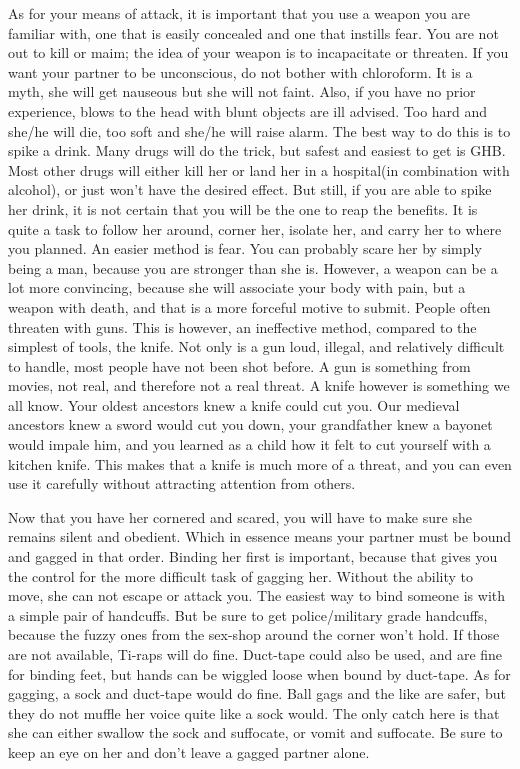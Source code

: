 As for your means of attack, it is important that you use a weapon you are 
familiar with, one that is easily concealed and one that instills fear. You are 
not out to kill or maim; the idea of your weapon is to incapacitate or 
threaten. If you want your partner to be unconscious, do not bother with 
chloroform. It is a myth, she will get nauseous but she will not faint. Also, 
if you have no prior experience, blows to the head with blunt objects are ill 
advised. Too hard and she/he will die, too soft and she/he will raise alarm. 
The best way to do this is to spike a drink. Many drugs will do the trick, but 
safest and easiest to get is GHB. Most other drugs will either kill her or land 
her in a hospital(in combination with alcohol), or just won't have the desired 
effect. But still, if you are able to spike her drink, it is not certain that 
you will be the one to reap the benefits. It is quite a task to follow her 
around, corner her, isolate her, and carry her to where you planned. An easier 
method is fear. You can probably scare her by simply being a man, because you 
are stronger than she is. However, a weapon can be a lot more convincing, 
because she will associate your body with pain, but a weapon with death, and 
that is a more forceful motive to submit. People often threaten with guns. This 
is however, an ineffective method, compared to the simplest of tools, the 
knife. Not only is a gun loud, illegal, and relatively difficult to handle, 
most people have not been shot before. A gun is something from movies, not real, 
and therefore not a real threat. A knife however is something we all know. Your 
oldest ancestors knew a knife could cut you. Our medieval ancestors knew a 
sword would cut you down, your grandfather knew a bayonet would impale him, and 
you learned as a child how it felt to cut yourself with a kitchen knife. This 
makes that a knife is much more of a threat, and you can even use it carefully 
without attracting attention from others.


Now that you have her cornered and scared, you will have to make sure she 
remains silent and obedient. Which in essence means your partner must be bound 
and gagged in that order. Binding her first is important, because that gives 
you the control for the more difficult task of gagging her. Without the ability 
to move, she can not escape or attack you. The easiest way to bind someone is 
with a simple pair of handcuffs. But be sure to get police/military grade 
handcuffs, because the fuzzy ones from the sex-shop around the corner won't 
hold. If those are not available, Ti-raps will do fine. Duct-tape could also be 
used, and are fine for binding feet, but hands can be wiggled loose when bound 
by duct-tape. As for gagging, a sock and duct-tape would do fine. Ball gags and 
the like are safer, but they do not muffle her voice quite like a sock would. 
The only catch here is that she can either swallow the sock and suffocate, or 
vomit and suffocate. Be sure to keep an eye on her and don't leave a gagged 
partner alone.



